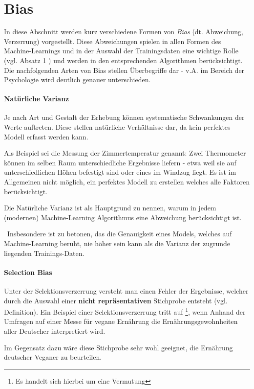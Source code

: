 
\section{Bias}
In diese Abschnitt werden kurz verschiedene Formen von \textit{Bias} (dt. Abweichung, Verzerrung) vorgestellt. Diese Abweichungen spielen in allen Formen des Machine-Learnings und in der Auswahl der Trainingsdaten eine wichtige Rolle (vgl. \cite{BiasTypes} Absatz 1 ) und werden in den entsprechenden Algorithmen berücksichtigt. Die nachfolgenden Arten von Bias stellen Überbegriffe dar - v.A. im Bereich der Psychologie wird deutlich genauer unterschieden.

\paragraph{Natürliche Varianz} Je nach Art und Gestalt der Erhebung können systematische Schwankungen der Werte auftreten. Diese stellen natürliche Verhältnisse dar, da kein perfektes Modell erfasst werden kann. 

Als Beispiel sei die Messung der Zimmertemperatur genannt: Zwei Thermometer können im selben Raum unterschiedliche Ergebnisse liefern - etwa weil sie auf unterschiedlichen Höhen befestigt sind oder eines im Windzug liegt. Es ist im Allgemeinen nicht möglich, ein perfektes Modell zu erstellen welches alle Faktoren berücksichtigt.

Die Natürliche Varianz ist als Hauptgrund zu nennen, warum in jedem (modernen) Machine-Learning Algorithmus eine Abweichung berücksichtigt ist. 

~\newline Insbesondere ist  zu betonen, das die Genauigkeit eines Models, welches auf Machine-Learning beruht, nie höher sein kann als die Varianz der zugrunde liegenden Trainings-Daten. 
\paragraph{Selection Bias} Unter der Selektionsverzerrung versteht man einen Fehler der Ergebnisse, welcher durch die Auswahl einer \textbf{nicht repräsentativen} Stichprobe entsteht (vgl. \cite{SelectionBias} Definition). Ein Beispiel einer Selektionsverzerrung tritt auf \footnote{Es handelt sich hierbei um eine Vermutung}, wenn Anhand der Umfragen auf einer Messe für vegane Ernährung die Ernährungsgewohnheiten aller Deutscher interpretiert wird. 

Im Gegensatz dazu wäre diese Stichprobe sehr wohl geeignet, die Ernährung deutscher Veganer zu beurteilen.  

